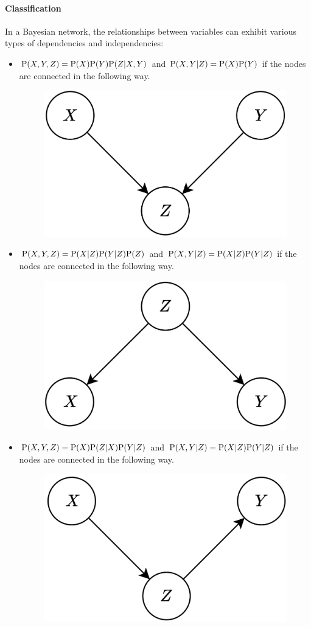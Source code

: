 \paragraph*{Classification}
In a Bayesian network, the relationships between variables can exhibit various types of dependencies and independencies: 
\begin{itemize}
    \item $\textnormal{P}(X,Y,Z)=\textnormal{P}(X)\textnormal{P}(Y)\textnormal{P}(Z|X,Y)$ and $\textnormal{P}(X,Y|Z)=\textnormal{P}(X)\textnormal{P}(Y)$ if the nodes are connected in the following way. 
        \begin{figure}[H]
            \centering
            \includegraphics[width=0.3\linewidth]{images/independencies1.png}
        \end{figure}
    \item $\textnormal{P}(X,Y,Z)=\textnormal{P}(X|Z)\textnormal{P}(Y|Z)\textnormal{P}(Z)$ and $\textnormal{P}(X,Y|Z)=\textnormal{P}(X|Z)\textnormal{P}(Y|Z)$ if the nodes are connected in the following way. 
        \begin{figure}[H]
            \centering
            \includegraphics[width=0.3\linewidth]{images/independencies2.png}
        \end{figure}
    \item $\textnormal{P}(X,Y,Z)=\textnormal{P}(X)\textnormal{P}(Z|X)\textnormal{P}(Y|Z)$ and $\textnormal{P}(X,Y|Z)=\textnormal{P}(X|Z)\textnormal{P}(Y|Z)$ if the nodes are connected in the following way. 
        \begin{figure}[H]
            \centering
            \includegraphics[width=0.3\linewidth]{images/independencies3.png}
        \end{figure}
\end{itemize}

